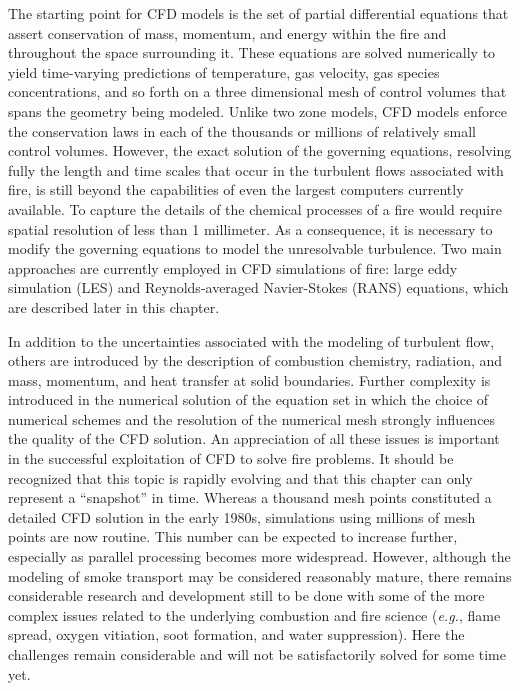 \documentclass[graybox]{svmult}
\begin{document}
The starting point for CFD models is the set of partial differential equations that assert conservation of mass, momentum, and energy within the fire and throughout the space surrounding it. These equations are solved numerically to yield time-varying predictions of temperature,  gas  velocity,  gas species concentrations, and so forth on a three dimensional mesh of control volumes that spans the geometry being modeled. Unlike two zone models, CFD models enforce the conservation laws in each of the thousands or millions of relatively small control volumes. However, the exact solution of the governing equations, resolving fully the length and time scales that occur in the turbulent flows associated with fire, is still beyond the capabilities of even the largest computers currently available. To capture the details of the chemical processes of a fire would require spatial resolution of less than 1 millimeter. As a consequence, it is necessary to modify the governing equations to model the unresolvable turbulence. Two main approaches are currently employed in CFD simulations of fire: large eddy simulation (LES) and Reynolds-averaged Navier-Stokes (RANS) equations, which are described later in this chapter.

In addition to the uncertainties associated with the modeling of turbulent flow, others are introduced by the description of combustion chemistry, radiation, and mass, momentum, and heat transfer at solid boundaries. Further complexity is introduced in the numerical solution of the equation set in which the choice of numerical schemes and the resolution of the numerical mesh strongly influences the quality of the CFD solution. An appreciation of all these issues is important in the successful exploitation of CFD to solve fire problems.
It should be recognized that this topic is rapidly evolving and that this chapter can only represent a ``snapshot'' in time. Whereas a thousand mesh points constituted a detailed CFD solution in the early 1980s, simulations using millions of mesh points are now routine. This number can be expected to increase further, especially as parallel processing becomes more widespread. However, although the modeling of smoke transport may be considered reasonably mature, there remains considerable research and development still to be done with some of the more complex issues related to the underlying combustion and fire science ({\em e.g.}, flame spread, oxygen vitiation, soot formation, and water suppression). Here the challenges remain considerable and will not be satisfactorily solved for some time yet.
\end{document}
